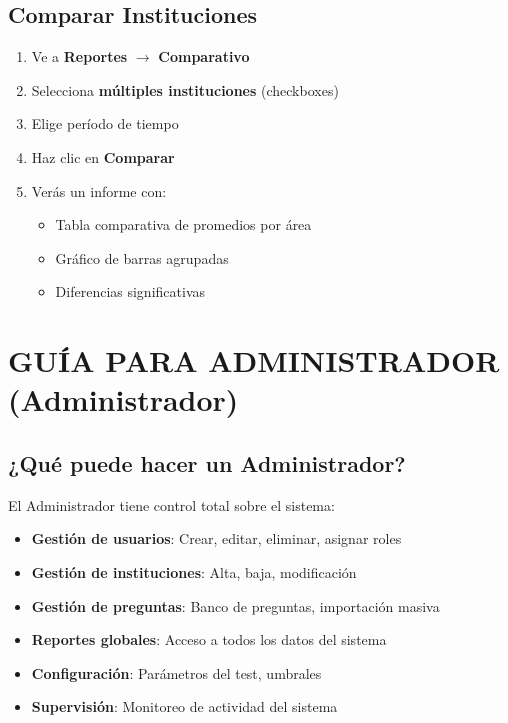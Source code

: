 \documentclass[12pt, a4paper]{report}
\newcommand{\roleadmin}{\textcolor{dangerred}{\textbf{Administrador}}}
\begin{document}
\section{Comparar Instituciones}
\begin{enumerate}
    \item Ve a \textbf{Reportes} $\rightarrow$ \textbf{Comparativo}
    \item Selecciona \textbf{múltiples instituciones} (checkboxes)
    \item Elige período de tiempo
\item Haz clic en \textbf{Comparar}
\item Verás un informe con:
    \begin{itemize}
        \item Tabla comparativa de promedios por área
        \item Gráfico de barras agrupadas
        \item Diferencias significativas
    \end{itemize}
\end{enumerate}

\chapter{GUÍA PARA ADMINISTRADOR (\roleadmin)}

\section{¿Qué puede hacer un Administrador?}
El Administrador tiene control total sobre el sistema:
\begin{itemize}
    \item \textbf{Gestión de usuarios}: Crear, editar, eliminar, asignar roles
    \item \textbf{Gestión de instituciones}: Alta, baja, modificación
    \item \textbf{Gestión de preguntas}: Banco de preguntas, importación masiva
    \item \textbf{Reportes globales}: Acceso a todos los datos del sistema
    \item \textbf{Configuración}: Parámetros del test, umbrales
    \item \textbf{Supervisión}: Monitoreo de actividad del sistema
\end{itemize}
\end{document}
